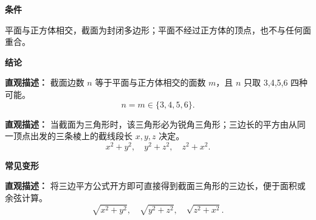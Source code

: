 \begin{statementbox}
	\textbf{\textcolor{CStatement}{条件}}
	\begin{description}[style=nextline, leftmargin=2.8em, labelsep=0.5em, itemsep=0.35em]
		\item[\textbf{\textcolor{CStatement}{条件 1（截面限制）：}}]
			平面与正方体相交，截面为封闭多边形；平面不经过正方体的顶点，也不与任何面重合。
	\end{description}
	\textbf{\textcolor{CStatement}{结论}}
	\begin{description}[style=nextline, leftmargin=2.8em, labelsep=0.5em, itemsep=0.45em]
		\item[\textbf{\textcolor{CStatement}{结论一（截面边数规则）：}}]
			\textbf{\textcolor{CStatement}{直观描述：}}
			截面边数 $n$ 等于平面与正方体相交的面数 $m$，且 $n$ 只取 3,4,5,6 四种可能。
			\[
				n = m \in \{3,4,5,6\}.
			\]
		\item[\textbf{\textcolor{CStatement}{结论二（三角形截面性质）：}}]
			\textbf{\textcolor{CStatement}{直观描述：}}
			当截面为三角形时，该三角形必为锐角三角形；三边长的平方由从同一顶点出发的三条棱上的截线段长 $x,y,z$ 决定。
			\[
				x^{2}+y^{2},\quad y^{2}+z^{2},\quad z^{2}+x^{2}.
			\]
	\end{description}
	\textbf{\textcolor{CStatement}{常见变形}}
	\begin{description}[style=nextline, leftmargin=2.8em, labelsep=0.5em, itemsep=0.45em]
		\item[\textbf{\textcolor{CStatement}{推广结论（边长公式）：}}]
			\textbf{\textcolor{CStatement}{直观描述：}}
			将三边平方公式开方即可直接得到截面三角形的三边长，便于面积或余弦计算。
			\[
				\sqrt{x^{2}+y^{2}},\quad \sqrt{y^{2}+z^{2}},\quad \sqrt{z^{2}+x^{2}}.
			\]
	\end{description}

\end{statementbox}
